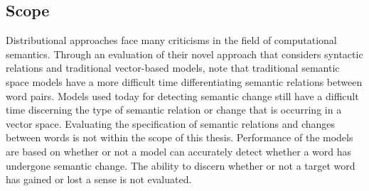 \subsection{Scope}
\label{intro-scope}
Distributional approaches face many criticisms in the field of computational semantics. Through an evaluation of their novel approach that considers syntactic relations and traditional vector-based models, \citet{pado-lapata-2003-constructing} note that traditional semantic space models have a more difficult time differentiating semantic relations between word pairs. Models used today for detecting semantic change still have a difficult time discerning the type of semantic relation or change that is occurring in a vector space. Evaluating the specification of semantic relations and changes between words is not within the scope of this thesis. Performance of the models are based on whether or not a model can accurately detect whether a word has undergone semantic change. The ability to discern whether or not a target word has gained or lost a sense is not evaluated. 

